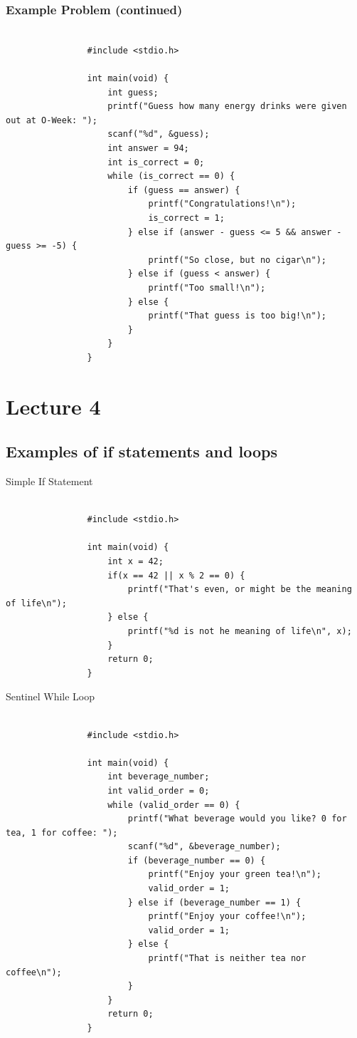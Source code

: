 \documentclass{article}
\begin{document}
		\subsubsection{Example Problem (continued)}
			\begin{verbatim}

				#include <stdio.h>

				int main(void) {
					int guess;
					printf("Guess how many energy drinks were given out at O-Week: ");
					scanf("%d", &guess);
					int answer = 94;
					int is_correct = 0;
					while (is_correct == 0) {
						if (guess == answer) {
							printf("Congratulations!\n");
							is_correct = 1;
						} else if (answer - guess <= 5 && answer - guess >= -5) {
							printf("So close, but no cigar\n");
						} else if (guess < answer) {
							printf("Too small!\n");
						} else {
							printf("That guess is too big!\n");
						}
					}
				}
			\end{verbatim}

\newpage

\section{Lecture 4}
	
	\subsection{Examples of if statements and loops}

		\begin{question}{Simple If Statement}
			\begin{verbatim}

				#include <stdio.h>

				int main(void) {
					int x = 42;
					if(x == 42 || x % 2 == 0) {
						printf("That's even, or might be the meaning of life\n");
					} else {
						printf("%d is not he meaning of life\n", x);
					}
					return 0;
				}

			\end{verbatim}
		\end{question}

		\begin{question}{Sentinel While Loop}
			\begin{verbatim}

				#include <stdio.h>

				int main(void) {
					int beverage_number;
					int valid_order = 0;
					while (valid_order == 0) {
						printf("What beverage would you like? 0 for tea, 1 for coffee: ");
						scanf("%d", &beverage_number);
						if (beverage_number == 0) {
							printf("Enjoy your green tea!\n");
							valid_order = 1;
						} else if (beverage_number == 1) {
							printf("Enjoy your coffee!\n");
							valid_order = 1;
						} else {
							printf("That is neither tea nor coffee\n");
						}
					}
					return 0;
				}

			\end{verbatim}
		\end{question}
\end{document}

